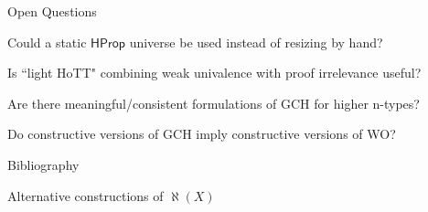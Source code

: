 \documentclass[xcolor=dvipsnames,compress,aspectratio=169,handout]{beamer}
\begin{document}
\begin{frame}{Open Questions}
	\begin{centering}
		\begin{widerbox}
		\center
		Could a static $\mathsf{HProp}$ universe be used instead of resizing by hand?
		\end{widerbox}
		\pause
		\vspace{0.3cm}
		\begin{widerbox}
		\center
		Is ``light HoTT" combining weak univalence with proof irrelevance useful?
		\end{widerbox}
		\pause
		\vspace{0.3cm}
		\begin{widerbox}
		\center
		Are there meaningful/consistent formulations of GCH for higher n-types?
		\end{widerbox}
		\pause
		\vspace{0.3cm}
		\begin{widerbox}
		\center
		Do constructive versions of GCH imply constructive versions of WO?
		\end{widerbox}
	\end{centering}
\end{frame}



\begin{frame}{Bibliography}
\footnotesize


\end{frame}

\begin{frame}{Alternative constructions of $\aleph(X)$}
\cite{han2020formal}
\end{frame}
\end{document}
